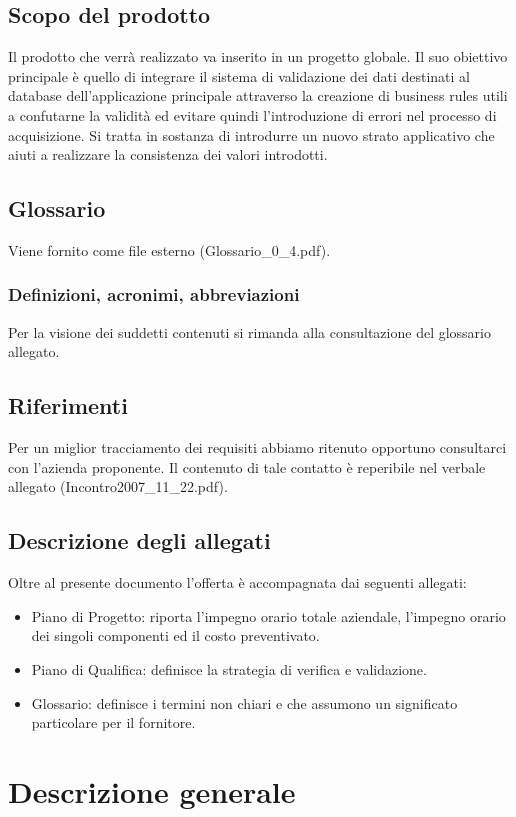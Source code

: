 \documentclass[11pt,titlepage,a4paper]{report}
\begin{document}
\section{Scopo del prodotto}
Il prodotto che verr\`a realizzato va inserito in un progetto globale. Il suo obiettivo principale \`e quello di integrare il sistema di validazione dei dati destinati al database dell'applicazione principale attraverso la creazione di business rules utili a confutarne la validit\`a ed evitare quindi l'introduzione di errori nel processo di acquisizione. Si tratta in sostanza di introdurre un nuovo strato applicativo che aiuti a realizzare la consistenza dei valori introdotti.
\section{Glossario}
Viene fornito come file esterno (Glossario\_0\_4.pdf).
\subsection{Definizioni, acronimi, abbreviazioni}
Per la visione dei suddetti contenuti si rimanda alla consultazione del glossario allegato. 
\section{Riferimenti}
Per un miglior tracciamento dei requisiti abbiamo ritenuto opportuno consultarci con l'azienda proponente. Il contenuto di tale contatto \`e reperibile nel verbale allegato (Incontro2007\_11\_22.pdf).
\section{Descrizione degli allegati}
Oltre al presente documento l'offerta \`e accompagnata dai seguenti allegati:
\begin{itemize}
\item Piano di Progetto: riporta l'impegno orario totale aziendale, l'impegno orario dei singoli componenti ed il costo preventivato.
\item{}Piano di Qualifica: definisce la strategia di verifica e validazione.
\item{}Glossario: definisce i termini non chiari e che assumono un significato particolare per il fornitore.
\end{itemize}
\chapter{Descrizione generale}
\end{document}
